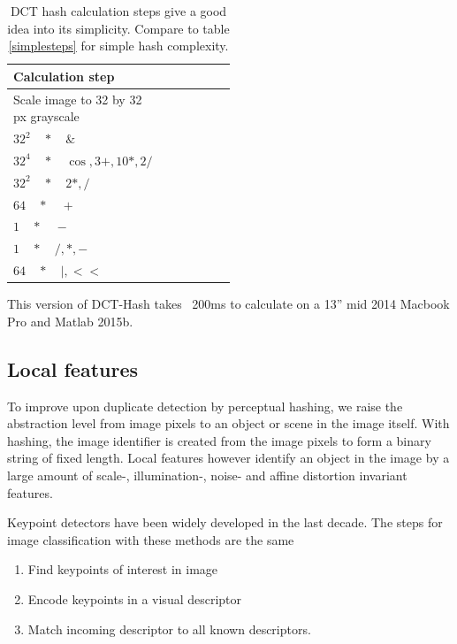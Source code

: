 \documentclass[english,12pt,a4paper,pdftex,elec,utf8]{aaltothesis}
\begin{document}
\def\arraystretch{1.5}
\begin{table}[htb]
\caption{DCT hash calculation steps give a good idea into its simplicity. Compare to table \ref{simplesteps} for simple hash complexity.}
\label{dctsteps}
\begin{center}
\begin{tabular}{lp{0.5\linewidth}}
  Calculation step\\
  \hline\hline
  Scale image to 32 by 32 px grayscale\\
  \hline
  $32^2\quad*\quad \&$ \\
  \hline
  $32^4 \quad*\quad \cos, 3+, 10*, 2/$ \\
  \hline
  $32^2\quad*\quad 2*, /$\\
  \hline
  $64 \quad*\quad +$\\
  \hline
  $1 \quad*\quad -$\\
  \hline
  $1 \quad*\quad /, *, -$\\
  \hline
  $64 \quad*\quad |, <<$\\
  \hline
\end{tabular}
\end{center}\end{table}

This version of DCT-Hash takes ~200ms to calculate on a 13'' mid 2014 Macbook Pro and Matlab 2015b.

\subsection{Local features}
To improve upon duplicate detection by perceptual hashing, we raise the abstraction level from image pixels to an object or scene in the image itself. With hashing, the image identifier is created from the image pixels to form a binary string of fixed length. Local features however identify an object in the image by a large amount of scale-, illumination-, noise- and affine distortion invariant features.

Keypoint detectors have been widely developed in the last decade. The steps for image classification with these methods are the same

\begin{enumerate}
\item Find keypoints of interest in image
\item Encode keypoints in a visual descriptor
\item Match incoming descriptor to all known descriptors.
\end{enumerate}
\end{document}

